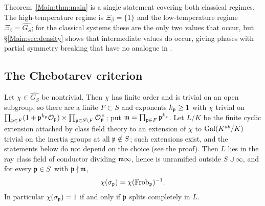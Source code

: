 \begin{remark}
Theorem~\ref{Main:thm:main} is a single statement covering both classical regimes.
The high-temperature regime is $\Xi_\beta=\{1\}$ and the low-temperature regime
$\Xi_\beta=\widehat{G_S}$; for the classical systems these are the only two
values that occur, but \S\ref{Main:sec:density} shows that intermediate values do
occur, giving phases with partial symmetry breaking that have no analogue in
\cite{BC,LLN}.
\end{remark}

\subsection{The Chebotarev criterion}

\begin{lemma}\label{Main:lem:frob}
Let $\chi\in\widehat{G_S}$ be nontrivial. Then $\chi$ has finite order and is
trivial on an open subgroup, so there are a finite $F\subset S$ and exponents
$k_{\mathfrak{p}}\ge1$ with $\chi$ trivial on
$\prod_{\mathfrak{p}\in F}(1+\mathfrak{p}^{k_{\mathfrak{p}}}\mathcal{O}_{\mathfrak{p}})\times\prod_{\mathfrak{p}\in S\setminus F}\mathcal{O}_{\mathfrak{p}}^\times$;
put $\mathfrak{m}=\prod_{\mathfrak{p}\in F}\mathfrak{p}^{k_{\mathfrak{p}}}$. Let $L/K$ be the finite cyclic extension
attached by class field theory to an extension of $\chi$ to $\operatorname{Gal}(K^{ab}/K)$ trivial on the
inertia groups at all $\mathfrak{p}\notin S$; such extensions exist, and the statements below do not
depend on the choice (see the proof). Then $L$ lies in the ray class field
of conductor dividing $\mathfrak{m}\infty$, hence is unramified outside $S\cup\infty$,
and for every $\mathfrak{p}\in S$ with $\mathfrak{p}\nmid\mathfrak{m}$,
\[
\chi(\sigma_{\mathfrak{p}})=\chi(\operatorname{Frob}_{\mathfrak{p}})^{-1}.
\]
In particular $\chi(\sigma_{\mathfrak{p}})=1$ if and only if $\mathfrak{p}$ splits completely in
$L$.
\end{lemma}

